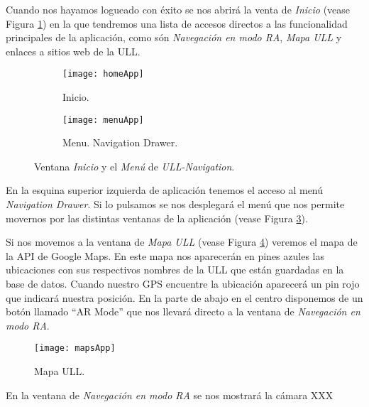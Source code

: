 Cuando nos hayamos logueado con éxito se nos abrirá la venta de \textit{Inicio} (vease Figura \ref{fig:homeApp}) en la que tendremos una lista de accesos directos a las funcionalidad principales de la aplicación, como són \textit{Navegación en modo RA}, \textit{Mapa ULL} y enlaces a sitios web de la ULL.


\begin{figure}[h]
    \hspace*{\fill}%
    \begin{subfigure}[h]{0.35\linewidth}
    \texttt{[image: homeApp]}
    \caption{Inicio.}
    \label{fig:homeApp}
    \end{subfigure}
    \hfill%
    \begin{subfigure}[h]{0.35\linewidth}
    \texttt{[image: menuApp]}
    \caption{Menu. Navigation Drawer.}
    \label{fig:menuApp}
    \end{subfigure}%
    \caption{Ventana \textit{Inicio} y el \textit{Menú} de \textit{ULL-Navigation}.}
    \hspace*{\fill}%
\end{figure}


En la esquina superior izquierda de aplicación tenemos el acceso al menú \textit{Navigation Drawer}. Si lo pulsamos se nos desplegará el menú que nos permite movernos por las distintas ventanas de la aplicación (vease Figura \ref{fig:menuApp}).

Si nos movemos a la ventana de \textit{Mapa ULL} (vease Figura \ref{fig:mapsApp}) veremos el mapa de la API de Google Maps. En este mapa nos aparecerán en pines azules las ubicaciones con sus respectivos nombres de la ULL que están guardadas en la base de datos. Cuando nuestro GPS encuentre la ubicación aparecerá un pin rojo que indicará nuestra posición. En la parte de abajo en el centro disponemos de un botón llamado ``AR Mode'' que nos llevará directo a la ventana de \textit{Navegación en modo RA}.
  
\begin{figure}[h]
	\centering
	\texttt{[image: mapsApp]}
	\caption{Mapa ULL.}
	\label{fig:mapsApp}
\end{figure}

En la ventana de \textit{Navegación en modo RA} se nos mostrará la cámara XXX




